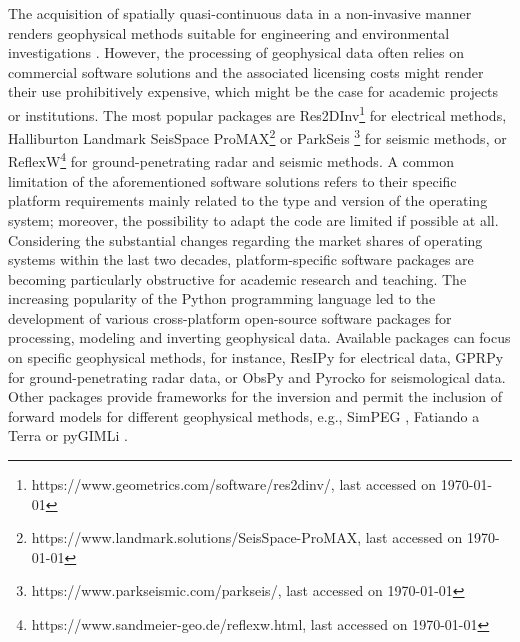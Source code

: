 \documentclass[a4paper,fleqn]{cas-sc}
\begin{document}
The acquisition of spatially quasi-continuous data in a non-invasive manner renders geophysical methods suitable for engineering and environmental investigations \citep[e.g.,][]{parsekian2015, nguyen2018, romero2019}.
However, the processing of geophysical data often relies on commercial software solutions and the associated licensing costs might render their use prohibitively expensive, which might be the case for academic projects or institutions.
The most popular packages are Res2DInv\footnote{https://www.geometrics.com/software/res2dinv/, last accessed on \today} for electrical methods, Halliburton Landmark SeisSpace ProMAX\footnote{https://www.landmark.solutions/SeisSpace-ProMAX, last accessed on \today} or ParkSeis \footnote{https://www.parkseismic.com/parkseis/, last accessed on \today} for seismic methods, or ReflexW\footnote{https://www.sandmeier-geo.de/reflexw.html, last accessed on \today} for ground-penetrating radar and seismic methods.
A common limitation of the aforementioned software solutions refers to their specific platform requirements mainly related to the type and version of the operating system; moreover, the possibility to adapt the code are limited if possible at all. Considering the substantial changes regarding the market shares of operating systems within the last two decades, platform-specific software packages are becoming particularly obstructive for academic research and teaching.
The increasing popularity of the Python programming language led to the development of various cross-platform open-source software packages for processing, modeling and inverting geophysical data. Available packages can focus on specific geophysical methods, for instance, ResIPy \citep{blanchy2020} for electrical data, GPRPy \citep{plattner2020} for ground-penetrating radar data, or ObsPy \citep{beyreuther2010} and Pyrocko \citep{heimann2017} for seismological data. Other packages provide frameworks for the inversion and permit the inclusion of forward models for different geophysical methods, e.g., SimPEG \citep{cockett2015}, Fatiando a Terra \citep{uieda2013} or pyGIMLi \citep{ruecker2017}. 
\end{document}
